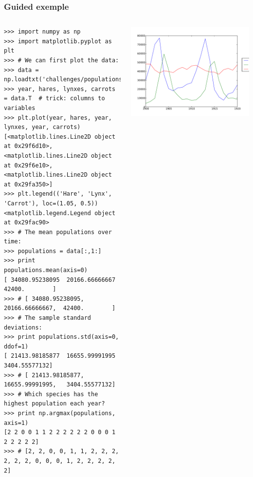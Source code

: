 \documentclass[colorlinks]{beamer}
\begin{document}
\begin{frame}[fragile]\frametitle{Guided exemple}
\begin{columns}[c]
\tiny
\begin{verbatim}
>>> import numpy as np
>>> import matplotlib.pyplot as plt
>>> # We can first plot the data:
>>> data = np.loadtxt('challenges/populations.txt')
>>> year, hares, lynxes, carrots = data.T  # trick: columns to variables
>>> plt.plot(year, hares, year, lynxes, year, carrots)
[<matplotlib.lines.Line2D object at 0x29f6d10>, <matplotlib.lines.Line2D object at 0x29f6e10>, <matplotlib.lines.Line2D object at 0x29fa350>]
>>> plt.legend(('Hare', 'Lynx', 'Carrot'), loc=(1.05, 0.5))
<matplotlib.legend.Legend object at 0x29fac90>
>>> # The mean populations over time:
>>> populations = data[:,1:]
>>> print populations.mean(axis=0)
[ 34080.95238095  20166.66666667  42400.        ]
>>> # [ 34080.95238095,  20166.66666667,  42400.        ]
>>> # The sample standard deviations:
>>> print populations.std(axis=0, ddof=1)
[ 21413.98185877  16655.99991995   3404.55577132]
>>> # [ 21413.98185877,  16655.99991995,   3404.55577132]
>>> # Which species has the highest population each year?
>>> print np.argmax(populations, axis=1)
[2 2 0 0 1 1 2 2 2 2 2 2 0 0 0 1 2 2 2 2 2]
>>> # [2, 2, 0, 0, 1, 1, 2, 2, 2, 2, 2, 2, 0, 0, 0, 1, 2, 2, 2, 2, 2]
\end{verbatim}

\includegraphics[width=\textwidth]{plwfigis/CursP_2_figure6}

\end{columns}
\end{frame}
\end{document}
